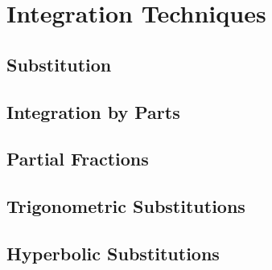 \chapter{Integration Techniques}

\section{Substitution}

\section{Integration by Parts}

\section{Partial Fractions}

\section{Trigonometric Substitutions}

\section{Hyperbolic Substitutions}